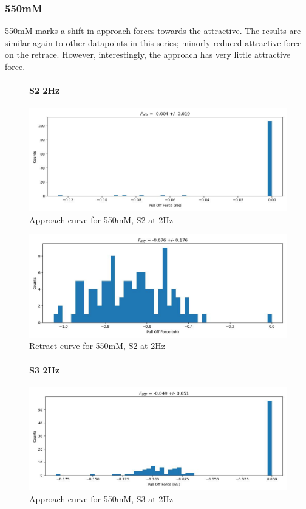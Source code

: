 \subsubsection*{550mM}
550mM marks a shift in approach forces towards the attractive. The results are similar again to other datapoints in this series; minorly reduced attractive force on the retrace. However, interestingly, the approach has very little attractive force. 
\begin{figure}[h!]
\paragraph{S2 2Hz}
\centering
\includegraphics[width=\textwidth]{chapter7/Tip speed/550mM/S2 2Hz/approach_f_a_hist.jpg}
\caption{Approach curve for 550mM, S2 at 2Hz}
\end{figure}

\begin{figure}[h!]
\centering
\includegraphics[width=\textwidth]{chapter7/Tip speed/550mM/S2 2Hz/retract_f_a_hist.jpg}
\caption{Retract curve for 550mM, S2 at 2Hz}
\end{figure}


\begin{figure}[h!]
\paragraph{S3 2Hz}
\centering
\includegraphics[width=\textwidth]{chapter7/Tip speed/550mM/S3 2Hz/approach_f_a_hist.jpg}
\caption{Approach curve for 550mM, S3 at 2Hz}
\end{figure}

